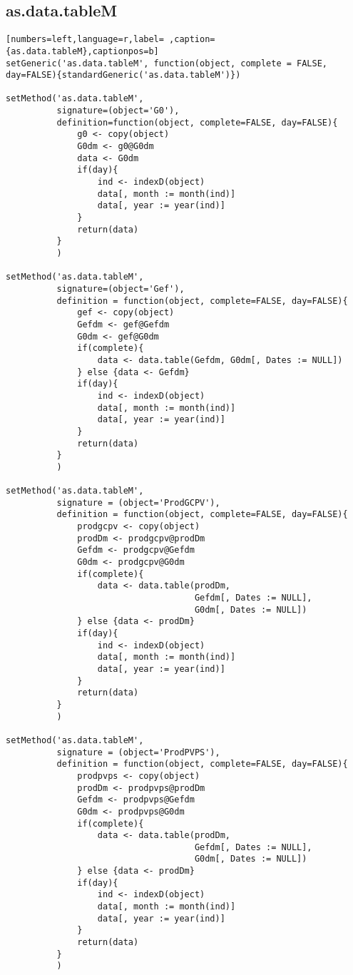 \subsection{as.data.tableM}
\label{sec:orgb72fd4e}
\begin{lstlisting}[numbers=left,language=r,label= ,caption={as.data.tableM},captionpos=b]
setGeneric('as.data.tableM', function(object, complete = FALSE, day=FALSE){standardGeneric('as.data.tableM')})

setMethod('as.data.tableM',
          signature=(object='G0'),
          definition=function(object, complete=FALSE, day=FALSE){
              g0 <- copy(object)
              G0dm <- g0@G0dm
              data <- G0dm
              if(day){
                  ind <- indexD(object)
                  data[, month := month(ind)]
                  data[, year := year(ind)]
              }
              return(data)
          }
          )

setMethod('as.data.tableM',
          signature=(object='Gef'),
          definition = function(object, complete=FALSE, day=FALSE){
              gef <- copy(object)
              Gefdm <- gef@Gefdm
              G0dm <- gef@G0dm
              if(complete){
                  data <- data.table(Gefdm, G0dm[, Dates := NULL])
              } else {data <- Gefdm}
              if(day){
                  ind <- indexD(object)
                  data[, month := month(ind)]
                  data[, year := year(ind)]
              }
              return(data)
          }
          )

setMethod('as.data.tableM',
          signature = (object='ProdGCPV'),
          definition = function(object, complete=FALSE, day=FALSE){
              prodgcpv <- copy(object)
              prodDm <- prodgcpv@prodDm
              Gefdm <- prodgcpv@Gefdm
              G0dm <- prodgcpv@G0dm
              if(complete){
                  data <- data.table(prodDm,
                                     Gefdm[, Dates := NULL],
                                     G0dm[, Dates := NULL])
              } else {data <- prodDm}
              if(day){
                  ind <- indexD(object)
                  data[, month := month(ind)]
                  data[, year := year(ind)]
              }
              return(data)
          }
          )

setMethod('as.data.tableM',
          signature = (object='ProdPVPS'),
          definition = function(object, complete=FALSE, day=FALSE){
              prodpvps <- copy(object)
              prodDm <- prodpvps@prodDm
              Gefdm <- prodpvps@Gefdm
              G0dm <- prodpvps@G0dm
              if(complete){
                  data <- data.table(prodDm,
                                     Gefdm[, Dates := NULL],
                                     G0dm[, Dates := NULL])
              } else {data <- prodDm}
              if(day){
                  ind <- indexD(object)
                  data[, month := month(ind)]
                  data[, year := year(ind)]
              }
              return(data)
          }
          )
\end{lstlisting}
